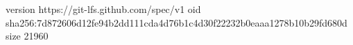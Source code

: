 version https://git-lfs.github.com/spec/v1
oid sha256:7d872606d12fe94b2dd111cda4d76b1c4d30f22232b0eaaa1278b10b29fd680d
size 21960
